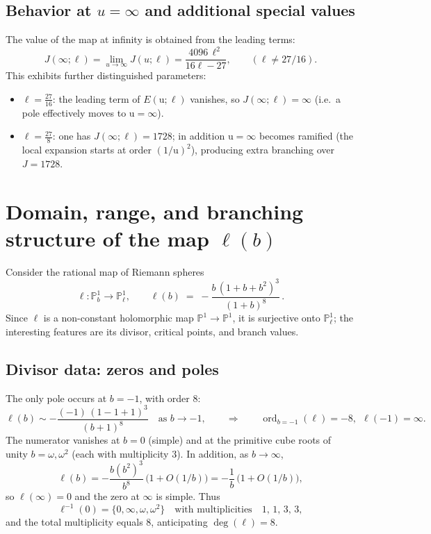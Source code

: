 \documentclass[11pt, a4paper]{article}
\newcommand{\ur}{\mathrm{u}}
\newcommand{\PP}{\mathbb{P}}
\newcommand{\om}{\omega}
\newcommand{\ord}{\operatorname{ord}}
\numberwithin{equation}{section}
\begin{document}
\subsection{Behavior at \texorpdfstring{$u=\infty$}{u = infinity} and additional special values}
The value of the map at infinity is obtained from the leading terms:
\begin{equation}
\label{eq:J-infty}
J(\infty;\ell)=\lim_{u\to\infty}J(u;\ell)=\frac{4096\,\ell^2}{16\ell-27},
\qquad (\ell\neq 27/16).
\end{equation}
This exhibits further distinguished parameters:
\begin{itemize}
\item $\ell=\frac{27}{16}$: the leading term of $E(\ur;\ell)$ vanishes, so $J(\infty;\ell)=\infty$
(i.e.\ a pole effectively moves to $\ur=\infty$).
\item $\ell=\frac{27}{8}$: one has $J(\infty;\ell)=1728$; in addition $\ur=\infty$ becomes
ramified (the local expansion starts at order $(1/\ur)^2$), producing extra branching over
$J=1728$.
\end{itemize}


\section{Domain, range, and branching structure of the map \texorpdfstring{$\ell(b)$}{el(b)}}
\label{sec:domain-range-branching-ell-of-b}

Consider the rational map of Riemann spheres
\begin{equation}
  \ell:\PP^1_b \longrightarrow \PP^1_\ell,
  \qquad
  \ell(b) \;=\; -\frac{b\,(1+b+b^2)^3}{(1+b)^8}\,.
\end{equation}
Since $\ell$ is a non-constant holomorphic map $\PP^1\to\PP^1$, it is surjective onto $\PP^1_\ell$; the interesting features are its divisor, critical points, and branch values.

\subsection{Divisor data: zeros and poles}
The only pole occurs at $b=-1$, with order $8$:
\begin{equation}
  \ell(b) \sim -\frac{(-1)\,(1-1+1)^3}{(b+1)^8}
  \quad\text{as } b\to -1,
  \qquad\Rightarrow\qquad
  \ord_{b=-1}(\ell)=-8,\ \ \ell(-1)=\infty.
\end{equation}
The numerator vanishes at $b=0$ (simple) and at the primitive cube roots of unity $b=\om,\om^2$ (each with multiplicity $3$). In addition, as $b\to\infty$,
\begin{equation}
  \ell(b)= -\frac{b(b^2)^3}{b^8}\,\bigl(1+O(1/b)\bigr)
  = -\frac{1}{b}\,\bigl(1+O(1/b)\bigr),
\end{equation}
so $\ell(\infty)=0$ and the zero at $\infty$ is simple. Thus
\begin{equation}
  \ell^{-1}(0)=\{0,\infty,\om,\om^2\}
  \quad\text{with multiplicities}\quad
  1,\,1,\,3,\,3,
\end{equation}
and the total multiplicity equals $8$, anticipating $\deg(\ell)=8$.
\end{document}
